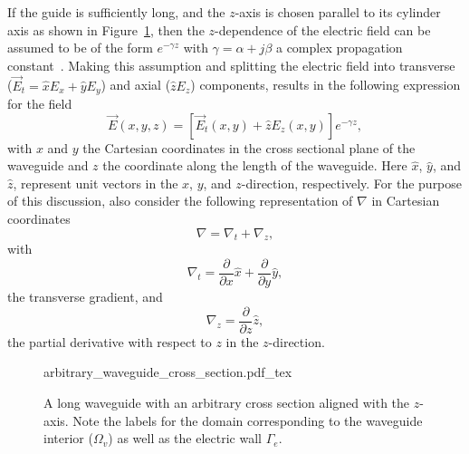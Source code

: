 If the guide is sufficiently long, and the $z$-axis is chosen parallel
to its cylinder axis as shown in
Figure~\ref{fig:lezar:long_waveguide}, then the $z$-dependence of the
electric field can be assumed to be of the form $e^{-\gamma z}$ with
$\gamma = \alpha + j\beta$ a complex propagation constant~\citep{PelosiCoccioliSelleri1998,
Pozar2005}. Making this assumption and splitting the electric field
into transverse ($\vec{E}_t = \hat{x}E_x + \hat{y}E_y$) and axial
($\hat{z}E_z$) components, results in the following expression for the
field
\begin{equation}
    \label{eq:lezar:field_components}
    \vec{E}(x,y,z) = [\vec{E}_t(x,y) + \hat{z}E_z(x,y)]e^{-\gamma z},
\end{equation}
with $x$ and $y$ the Cartesian coordinates in the cross sectional
plane of the waveguide and $z$ the coordinate along the length of the
waveguide. Here $\hat{x}$, $\hat{y}$, and $\hat{z}$, represent unit
vectors in the $x$, $y$, and $z$-direction, respectively. For the
purpose of this discussion, also consider the following representation
of $\nabla$ in Cartesian coordinates
\begin{equation}
  \label{eq:lezar:nabla_components}
  \nabla = \nabla_t + \nabla_z,
\end{equation}
with
\begin{equation}
  \nabla_t = \frac{\partial}{\partial x}\hat{x} + \frac{\partial}{\partial y}\hat{y},
\end{equation}
the transverse gradient, and
\begin{equation}
  \nabla_z = \frac{\partial}{\partial z}\hat{z},
\end{equation}
the partial derivative with respect to $z$ in the $z$-direction.

\begin{figure}
  \centering
 \def\svgwidth{\smallfig}
 {arbitrary_waveguide_cross_section.pdf_tex}
 \caption{A long waveguide with an arbitrary cross section aligned
 with the $z$-axis. Note the labels for the domain corresponding to the
 waveguide interior ($\Omega_v$) as well as the electric wall $\Gamma_e$.}
 \label{fig:lezar:long_waveguide}
\end{figure}

\enlargethispage{6pt}

